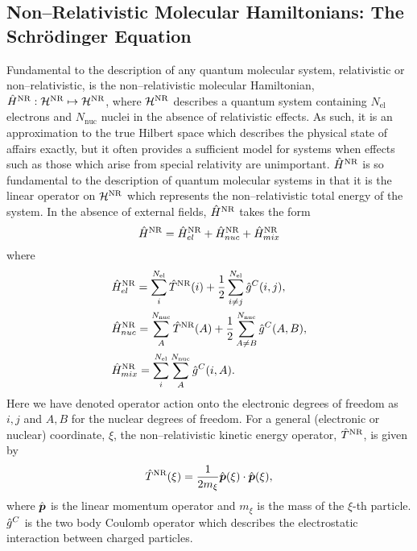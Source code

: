 

\subsection{Non--Relativistic Molecular Hamiltonians: The Schr\"{o}dinger Equation}
\label{sec:NRH}

Fundamental to the description of any quantum molecular system, relativistic or non--relativistic, is the non--relativistic
molecular Hamiltonian, $\hat{H}^{\mathrm{NR}} : \mathcal{H}^{\mathrm{NR}} \mapsto \mathcal{H}^{\mathrm{NR}}$, where $\mathcal{H}^{\mathrm{NR}}$ describes a quantum
system containing $N_\mathrm{el}$ electrons and $N_\mathrm{nuc}$ nuclei in the absence of relativistic effects. As such,
it is an approximation to the true Hilbert space which describes the physical state of affairs exactly, but it often
provides a sufficient model for systems when effects such as those which arise from special relativity are unimportant.
$\hat{H}^{\mathrm{NR}}$ is so fundamental to the description
of quantum molecular systems in that it is the linear operator on $\mathcal{H}^{\mathrm{NR}}$ which represents the non--relativistic 
total energy of the system.  In the absence of external fields, $\hat{H}^{\mathrm{NR}}$ takes the form
\begin{equation}
  \label{eq:FullHNR}
  \hat{H}^{\mathrm{NR}} = \hat{H}_{el}^{\mathrm{NR}} + \hat{H}_{nuc}^{\mathrm{NR}} + \hat{H}_{mix}^{\mathrm{NR}}
\end{equation}
where 
\begin{subequations}
\begin{align}
  &\hat{H}_{el}^{\mathrm{NR}}  = \sum_i^{N_\mathrm{el}}\hat{T}^{\mathrm{NR}}(i) + \frac{1}{2}\sum_{i \neq j}^{N_\mathrm{el}} \hat{g}^C(i,j),\\ 
  &\hat{H}_{nuc}^{\mathrm{NR}} = \sum_A^{N_\mathrm{nuc}}\hat{T}^{\mathrm{NR}}(A) + \frac{1}{2}\sum_{A \neq B}^{N_\mathrm{nuc}} \hat{g}^C(A,B),\\ 
  &\hat{H}^{\mathrm{NR}}_{mix} = \sum_i^{N_\mathrm{el}} \sum_A^{N_\mathrm{nuc}} \hat{g}^C(i,A).
\end{align}
\end{subequations}
Here we have denoted operator action onto the electronic degrees of freedom as $i,j$ and $A,B$ for the nuclear degrees of
freedom. For a general (electronic or nuclear) coordinate, $\xi$, the non--relativistic kinetic energy operator, 
$\hat{T}^{\mathrm{NR}}$, is given by
\begin{align}
  \hat{T}^{\mathrm{NR}}(\xi) = \frac{1}{2m_\xi} \hat{\boldsymbol{p}}(\xi) \cdot \hat{\boldsymbol{p}}(\xi),
\end{align}
where $\hat{\boldsymbol{p}}$ is the linear momentum operator and $m_\xi$ is the mass of the $\xi$-th particle.
$\hat{g}^C$ is the two body Coulomb operator which describes the electrostatic interaction between charged particles.

